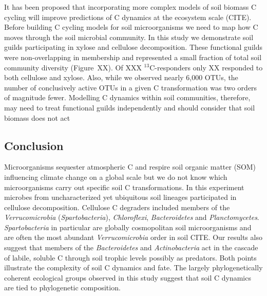 It has been proposed that incorporating more complex models of soil biomass
C cycling will improve predictions of C dynamics at the ecosystem scale (CITE).
Before building C cycling models for soil microorganisms we need to map how
C moves through the soil microbial community. In this study we demonstrate soil
guilds participating in xylose and cellulose decomposition. These
functional guilds were non-overlapping in membership and represented a small
fraction of total soil community diversity (Figure~XX). Of XXX
$^{13}$C-responders only XX responded to both cellulose and xylose. Also, while
we observed nearly 6,000 OTUs, the number of conclusively active OTUs in
a given C transformation was two orders of magnitude fewer. Modelling
C dynamics within soil communities, therefore, may need to treat functional
guilds independently and should consider that soil biomass does not act

\subsection{Conclusion} 
Microorganisms sequester atmospheric C and respire soil organic
matter (SOM) influencing climate change on a global scale but we do not
know which microorganisms carry out specific soil C transformations. In
this experiment microbes from uncharacterized yet ubiquitous soil lineages
participated in cellulose decomposition. Cellulose C degraders included
members of the \textit{Verrucomicrobia} (\textit{Spartobacteria}),
\textit{Chloroflexi}, \textit{Bacteroidetes} and \textit{Planctomycetes}.
\textit{Spartobacteria} in particular are globally cosmopolitan soil
microorganisms and are often the most abundant \textit{Verrucomicrobia}
order in soil CITE. Our results also suggest that members of the
\textit{Bacteroidetes} and \textit{Actinobacteria} act in the cascade of
labile, soluble C through soil trophic levels possibly as predators. Both
points illustrate the complexity of soil C dynamics and fate. The largely
phylogenetically coherent ecological groups observed in this study suggest that
soil C dynamics are tied to phylogenetic composition.
